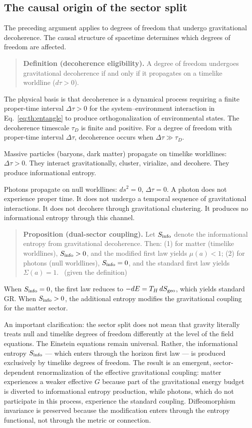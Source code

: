 \subsection{The causal origin of the sector split}
The preceding argument applies to degrees of freedom that undergo gravitational decoherence. The causal structure of spacetime determines which
degrees of freedom are affected.

\begin{quote}
\textbf{Definition (decoherence eligibility).} A degree of freedom undergoes gravitational decoherence if and only if it propagates on a timelike
worldline ($d\tau>0$). \conjecture
\end{quote}
The physical basis is that decoherence is a dynamical process requiring a finite proper-time interval $\Delta\tau>0$ for the system--environment
interaction in Eq.~\eqref{eq:th:entangle} to produce orthogonalization of environmental states. The decoherence timescale $\tau_D$ is finite and positive. For a
degree of freedom with proper-time interval $\Delta\tau$, decoherence occurs when $\Delta\tau\gg\tau_D$.

Massive particles (baryons, dark matter) propagate on timelike worldlines: $\Delta\tau>0$. They interact gravitationally, cluster, virialize, and
decohere. They produce informational entropy.

Photons propagate on null worldlines: $ds^2=0$, $\Delta\tau=0$. A photon does not experience proper time. It does not undergo a temporal sequence of
gravitational interactions. It does not decohere through gravitational clustering. It produces no informational entropy through this channel.

\begin{quote}
\textbf{Proposition (dual-sector coupling).} Let $S_{\rm info}$ denote the informational entropy from gravitational decoherence. Then:
(1) for matter (timelike worldlines), $S_{\rm info}>0$, and the modified first law yields $\mu(a)<1$;
(2) for photons (null worldlines), $S_{\rm info}=0$, and the standard first law yields $\Sigma(a)=1$. \derived\ (given the definition)
\end{quote}
When $S_{\rm info}=0$, the first law reduces to $-dE=T_H\,dS_{\rm geo}$, which yields standard GR. When $S_{\rm info}>0$, the additional entropy modifies
the gravitational coupling for the matter sector.

An important clarification: the sector split does not mean that gravity literally treats null and timelike degrees of freedom differently at the
level of the field equations. The Einstein equations remain universal. Rather, the informational entropy $S_{\rm info}$ --- which enters through the
horizon first law --- is produced exclusively by timelike degrees of freedom. The result is an emergent, sector-dependent renormalization of the
effective gravitational coupling: matter experiences a weaker effective $G$ because part of the gravitational energy budget is diverted to
informational entropy production, while photons, which do not participate in this process, experience the standard coupling. Diffeomorphism
invariance is preserved because the modification enters through the entropy functional, not through the metric or connection. \interp


